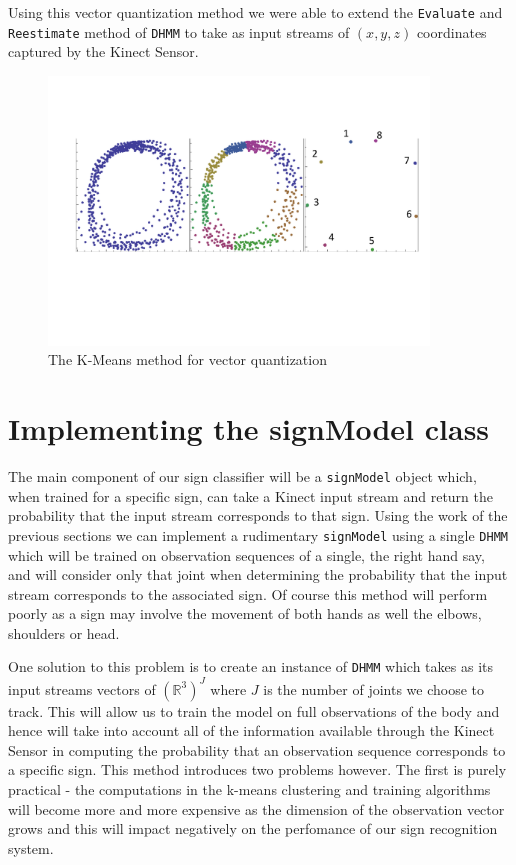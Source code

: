 Using this vector quantization method we were able to extend the \verb|Evaluate| and \verb|Reestimate| method of \verb|DHMM| to take as input streams of $(x,y,z)$ coordinates captured by the Kinect Sensor.

\begin{figure}[h!]
        \centering
        \includegraphics[width=0.9\textwidth]{ThesisFigs/ClusteringDiag}
        \caption{The K-Means method for vector quantization}\label{fig:kmeans}
\end{figure}

\section{Implementing the signModel class}
The main component of our sign classifier will be a \verb|signModel| object which, when trained for a specific sign, can take a Kinect input stream and return the probability that the input stream corresponds to that sign. Using the work of the previous sections we can implement a rudimentary \verb|signModel| using a single \verb|DHMM| which will be trained on observation sequences of a single, the right hand say, and will consider only that joint when determining the probability that the input stream corresponds to the associated sign. Of course this method will perform poorly as a sign may involve the movement of both hands as well the elbows, shoulders or head.

One solution to this problem is to create an instance of \verb|DHMM| which takes as its input streams vectors of $(\mathbb{R}^3)^J$ where $J$ is the number of joints we choose to track. This will allow us to train the model on full observations of the body and hence will take into account all of the information available through the Kinect Sensor in computing the probability that an observation sequence corresponds to a specific sign. This method introduces two problems however. The first is purely practical - the computations in the k-means clustering and training algorithms will become more and more expensive as the dimension of the observation vector grows and this will impact negatively on the perfomance of our sign recognition system.

